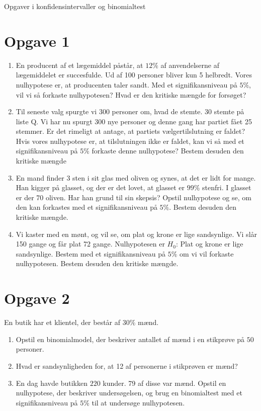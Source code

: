 \begin{center}
\Huge
Opgaver i konfidensintervaller og binomialtest
\end{center}


\section*{Opgave 1}
\begin{enumerate}[label=\roman*)]
\item En producent af et lægemiddel påstår, at $12\%$ af anvendelserne af lægemiddelet er succesfulde. Ud af 100 personer bliver kun 5 helbredt. Vores nulhypotese er, at producenten taler sandt. Med et signifikansniveau på $5\%$, vil vi så forkaste nulhypotesen? Hvad er den kritiske mængde for forsøget?
\item Til seneste valg spurgte vi 300 personer om, hvad de stemte. 30 stemte på liste Q. Vi har nu spurgt 300 nye personer og denne gang har partiet fået 25 stemmer. Er det rimeligt at antage, at partiets vælgertilslutning er faldet? Hvis vores nulhypotese er, at tilslutningen ikke er faldet, kan vi så med et signifikansniveau på $5\%$ forkaste denne nulhypotese? Bestem desuden den kritiske mængde
\item En mand finder 3 sten i sit glas med oliven og synes, at det er lidt for mange. Han kigger på glasset, og der er det lovet, at glasset er $99\%$ stenfri. I glasset er der 70 oliven. Har han grund til sin skepsis? Opstil nulhypotese og se, om den kan forkastes med et signifikansniveau på $5\%$. Bestem desuden den kritiske mængde. 
\item Vi kaster med en mønt, og vil se, om plat og krone er lige sandsynlige. Vi slår 150 gange og får plat 72 gange. Nulhypotesen er $H_0$: Plat og krone er lige sandsynlige. Bestem med et signifikansniveau på $5\%$ om vi vil forkaste nulhypotesen. Bestem desuden den kritiske mængde. 
\end{enumerate}

\section*{Opgave 2}
En butik har et klientel, der består af $30\%$ mænd. 
\begin{enumerate}[label=\roman*)]
\item Opstil en binomialmodel, der beskriver antallet af mænd i en stikprøve på $50$ personer.
\item Hvad er sandsynligheden for, at 12 af personerne i stikprøven er mænd?
\item En dag havde butikken $220$ kunder. 79 af disse var mænd. Opstil en nulhypotese, der beskriver undersøgelsen, og brug en binomialtest med et signifikansniveau på $5\%$ til at undersøge nulhypotesen. 
\end{enumerate}

